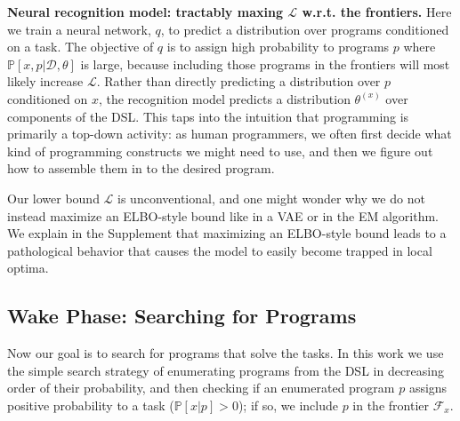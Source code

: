 \documentclass{article}
\newcommand{\lowerBound}{\mathscr{L}}
\newcommand{\probability}{\mathds{P}} %
\begin{document}
\textbf{Neural recognition model: tractably maxing $\lowerBound$ w.r.t. the
  frontiers.}  Here we train a neural network, $q$, to predict a
distribution over programs conditioned on a task. The objective of $q$
is to assign high probability to programs $p$ where
$\probability[x,p|\mathcal{D},\theta]$ is large, because including those programs
in the frontiers will most likely increase $\lowerBound$.  %
Rather than directly predicting a distribution over $p$ conditioned on $x$,
the recognition model predicts a distribution $\theta^{(x)}$ over components of the DSL.
This taps into the intuition that programming is primarily a top-down activity:
as human programmers, we often first decide what kind of
programming constructs we might need to use,
and then we figure out how to assemble them in to the desired program.

Our lower bound $\lowerBound$ is unconventional,
and one might wonder why we do not instead maximize an ELBO-style bound like in a VAE or in the EM algorithm.
We explain in the Supplement that maximizing an ELBO-style bound
leads to a pathological behavior that  causes the model to easily become trapped in local optima.





\subsection{Wake Phase: Searching for Programs}\label{explorationSection}

Now our goal is to search for programs that solve the tasks.  In this
work we use the simple search strategy of enumerating programs from
the DSL  in decreasing order of their probability,
and then checking if an enumerated program $p$ assigns positive
probability to a task ($\probability[x|p] > 0$); if so, we include $p$ in
the frontier $\mathcal{F}_x$.
\end{document}
